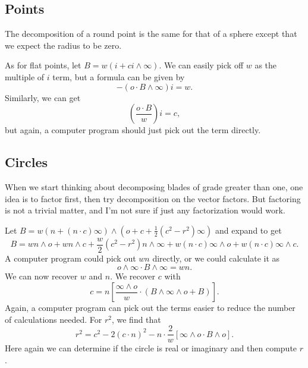 \documentclass[12pt]{article}
\newcommand{\nvao}{o}
\newcommand{\nvai}{\infty}
\begin{document}
\subsection*{Points}

The decomposition of a round point is the same for that of a sphere except that we expect the radius to be zero.

As for flat points, let $B=w(i+ci\wedge\nvai)$.  We can easily pick off $w$ as the multiple of $i$ term, but a formula
can be given by
\begin{equation*}
-(\nvao\cdot B\wedge\nvai)i = w.
\end{equation*}
Similarly, we can get
\begin{equation*}
\left(\frac{\nvao\cdot B}{w}\right)i = c,
\end{equation*}
but again, a computer program should just pick out the term directly.

\subsection*{Circles}

When we start thinking about decomposing blades of grade greater than one,
one idea is to factor first, then try decomposition on the vector factors.  But factoring
is not a trivial matter, and I'm not sure if just any factorization would work.

Let $B=w(n+(n\cdot c)\nvai)\wedge\left(\nvao + c + \frac{1}{2}(c^2-r^2)\nvai\right)$ and
expand to get
\begin{equation*}
B = wn\wedge\nvao + wn\wedge c + \frac{w}{2}(c^2-r^2)n\wedge\nvai+w(n\cdot c)\nvai\wedge\nvao + w(n\cdot c)\nvai\wedge c.
\end{equation*}
A computer program could pick out $wn$ directly, or we could calculate it as
\begin{equation*}
\nvao\wedge\nvai\cdot B\wedge\nvai = wn.
\end{equation*}
We can now recover $w$ and $n$.  We recover $c$ with
\begin{equation*}
c = n\left[\frac{\nvai\wedge\nvao}{w}\cdot\left(B\wedge\nvai\wedge\nvao + B\right)\right].
\end{equation*}
Again, a computer program can pick out the terms easier to reduce the number of calculations needed.
For $r^2$, we find that
\begin{equation*}
r^2 = c^2 - 2(c\cdot n)^2 - n\cdot\frac{2}{w}\left[\nvai\wedge\nvao\cdot B\wedge\nvao\right].
\end{equation*}
Here again we can determine if the circle is real or imaginary and then compute $r$.
\end{document}
